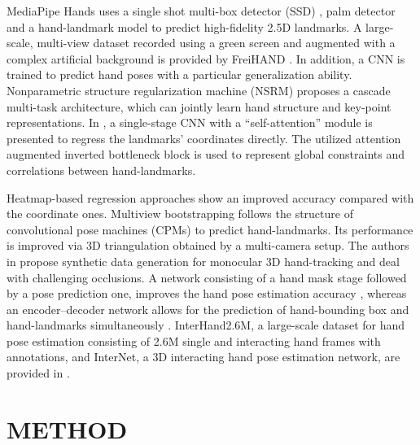 \documentclass[11pt]{article}
\begin{document}
MediaPipe Hands \cite{ref27} uses a single shot multi-box detector (SSD) \cite{ref25}, palm detector and a hand-landmark model to predict high-fidelity 2.5D landmarks. A large-scale, multi-view dataset recorded using a green screen and augmented with a complex artificial background is provided by FreiHAND \cite{ref26}. In addition, a CNN is trained to predict hand poses with a particular generalization ability. Nonparametric structure regularization machine (NSRM) \cite{ref2} proposes a cascade multi-task architecture, which can jointly learn hand structure and key-point representations. In \cite{ref9}, a single-stage CNN with a ``self-attention'' module is presented to regress the landmarks’ coordinates directly. The utilized attention augmented inverted bottleneck block is used to represent global constraints and correlations between hand-landmarks.

Heatmap-based regression approaches show an improved accuracy compared with the coordinate ones. Multiview bootstrapping \cite{ref29} follows the structure of convolutional pose machines (CPMs) \cite{ref28} to predict hand-landmarks. Its performance is improved via 3D triangulation obtained by a multi-camera setup. The authors in \cite{ref30} propose synthetic data generation for monocular 3D hand-tracking and deal with challenging occlusions. A network consisting of a hand mask stage followed by a pose prediction one, improves the hand pose estimation accuracy \cite{ref31}, whereas an encoder--decoder network allows for the prediction of hand-bounding box and hand-landmarks simultaneously \cite{ref1}. InterHand2.6M, a large-scale dataset for hand pose estimation consisting of 2.6M single and interacting hand frames with annotations, and InterNet, a 3D interacting hand pose estimation network, are provided in \cite{ref3}.

\section{METHOD}
\end{document}
